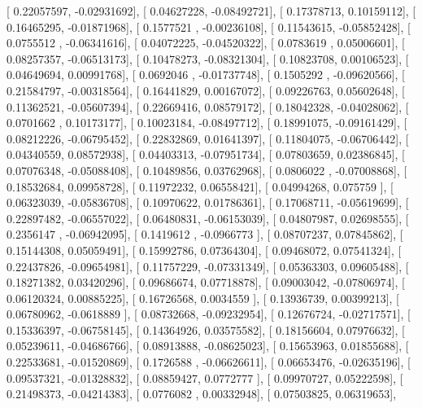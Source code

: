 \documentclass{article}
\begin{document}
       [ 0.22057597, -0.02931692],
       [ 0.04627228, -0.08492721],
       [ 0.17378713,  0.10159112],
       [ 0.16465295, -0.01871968],
       [ 0.1577521 , -0.00236108],
       [ 0.11543615, -0.05852428],
       [ 0.0755512 , -0.06341616],
       [ 0.04072225, -0.04520322],
       [ 0.0783619 ,  0.05006601],
       [ 0.08257357, -0.06513173],
       [ 0.10478273, -0.08321304],
       [ 0.10823708,  0.00106523],
       [ 0.04649694,  0.00991768],
       [ 0.0692046 , -0.01737748],
       [ 0.1505292 , -0.09620566],
       [ 0.21584797, -0.00318564],
       [ 0.16441829,  0.00167072],
       [ 0.09226763,  0.05602648],
       [ 0.11362521, -0.05607394],
       [ 0.22669416,  0.08579172],
       [ 0.18042328, -0.04028062],
       [ 0.0701662 ,  0.10173177],
       [ 0.10023184, -0.08497712],
       [ 0.18991075, -0.09161429],
       [ 0.08212226, -0.06795452],
       [ 0.22832869,  0.01641397],
       [ 0.11804075, -0.06706442],
       [ 0.04340559,  0.08572938],
       [ 0.04403313, -0.07951734],
       [ 0.07803659,  0.02386845],
       [ 0.07076348, -0.05088408],
       [ 0.10489856,  0.03762968],
       [ 0.0806022 , -0.07008868],
       [ 0.18532684,  0.09958728],
       [ 0.11972232,  0.06558421],
       [ 0.04994268,  0.075759  ],
       [ 0.06323039, -0.05836708],
       [ 0.10970622,  0.01786361],
       [ 0.17068711, -0.05619699],
       [ 0.22897482, -0.06557022],
       [ 0.06480831, -0.06153039],
       [ 0.04807987,  0.02698555],
       [ 0.2356147 , -0.06942095],
       [ 0.1419612 , -0.0966773 ],
       [ 0.08707237,  0.07845862],
       [ 0.15144308,  0.05059491],
       [ 0.15992786,  0.07364304],
       [ 0.09468072,  0.07541324],
       [ 0.22437826, -0.09654981],
       [ 0.11757229, -0.07331349],
       [ 0.05363303,  0.09605488],
       [ 0.18271382,  0.03420296],
       [ 0.09686674,  0.07718878],
       [ 0.09003042, -0.07806974],
       [ 0.06120324,  0.00885225],
       [ 0.16726568,  0.0034559 ],
       [ 0.13936739,  0.00399213],
       [ 0.06780962, -0.0618889 ],
       [ 0.08732668, -0.09232954],
       [ 0.12676724, -0.02717571],
       [ 0.15336397, -0.06758145],
       [ 0.14364926,  0.03575582],
       [ 0.18156604,  0.07976632],
       [ 0.05239611, -0.04686766],
       [ 0.08913888, -0.08625023],
       [ 0.15653963,  0.01855688],
       [ 0.22533681, -0.01520869],
       [ 0.1726588 , -0.06626611],
       [ 0.06653476, -0.02635196],
       [ 0.09537321, -0.01328832],
       [ 0.08859427,  0.0772777 ],
       [ 0.09970727,  0.05222598],
       [ 0.21498373, -0.04214383],
       [ 0.0776082 ,  0.00332948],
       [ 0.07503825,  0.06319653],
\end{document}
